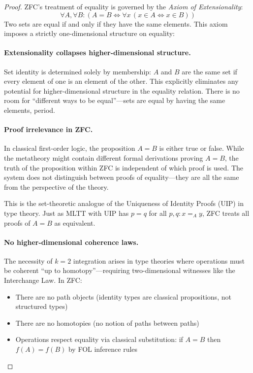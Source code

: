 \documentclass[11pt]{article}
\theoremstyle{definition}
\theoremstyle{remark}
\begin{document}
\begin{proof}
ZFC's treatment of equality is governed by the \emph{Axiom of Extensionality}:
\[
\forall A, \forall B: (A=B \iff \forall x\, (x \in A \iff x \in B))
\]
Two sets are equal if and only if they have the same elements. This axiom imposes a strictly one-dimensional structure on equality:

\paragraph{Extensionality collapses higher-dimensional structure.}
Set identity is determined solely by membership: $A$ and $B$ are the same set if every element of one is an element of the other. This explicitly eliminates any potential for higher-dimensional structure in the equality relation. There is no room for ``different ways to be equal''---sets are equal by having the same elements, period.

\paragraph{Proof irrelevance in ZFC.}
In classical first-order logic, the proposition $A = B$ is either true or false. While the metatheory might contain different formal derivations proving $A = B$, the truth of the proposition within ZFC is independent of which proof is used. The system does not distinguish between proofs of equality---they are all the same from the perspective of the theory.

This is the set-theoretic analogue of the Uniqueness of Identity Proofs (UIP) in type theory. Just as MLTT with UIP has $p = q$ for all $p, q : x =_A y$, ZFC treats all proofs of $A = B$ as equivalent.

\paragraph{No higher-dimensional coherence laws.}
The necessity of $k=2$ integration arises in type theories where operations must be coherent ``up to homotopy''---requiring two-dimensional witnesses like the Interchange Law. In ZFC:
\begin{itemize}
\item There are no path objects (identity types are classical propositions, not structured types)
\item There are no homotopies (no notion of paths between paths)
\item Operations respect equality via classical substitution: if $A = B$ then $f(A) = f(B)$ by FOL inference rules
\end{itemize}


\end{proof}
\end{document}
